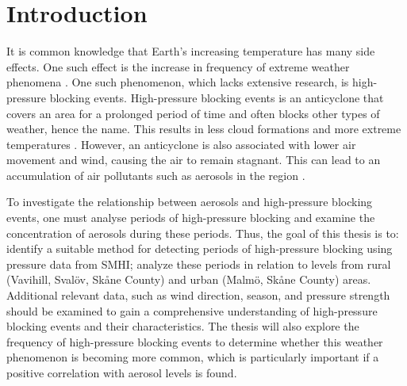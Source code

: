 \section{Introduction}
It is common knowledge that Earth's increasing temperature has many side effects. One such effect is the increase in frequency of extreme weather phenomena \cite{mitchellExtremeEventsDue2006}. One such phenomenon, which lacks extensive research, is high-pressure blocking events. High-pressure blocking events is an anticyclone that covers an area for a prolonged period of time and often blocks other types of weather, hence the name. This results in less cloud formations and more extreme temperatures \cite{lupoAtmosphericBlockingEvents2020}. However, an anticyclone is also associated with lower air movement and wind, causing the air to remain stagnant. This can lead to an accumulation of air pollutants such as aerosols in the region \cite{caiImpactBlockingStructure2020}.

To investigate the relationship between aerosols and high-pressure blocking events, one must analyse periods of high-pressure blocking and examine the concentration of aerosols during these periods. Thus, the goal of this thesis is to: identify a suitable method for detecting periods of high-pressure blocking using pressure data from SMHI; analyze these periods in relation to \PM levels from rural (Vavihill, Svalöv, Skåne County) and urban (Malmö, Skåne County) areas. Additional relevant data, such as wind direction, season, and pressure strength should be examined to gain a comprehensive understanding of high-pressure blocking events and their characteristics. The thesis will also explore the frequency of high-pressure blocking events to determine whether this weather phenomenon is becoming more common, which is particularly important if a positive correlation with aerosol levels is found.

